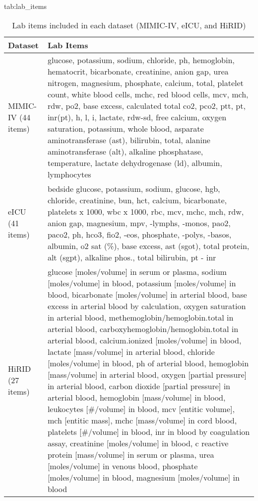 \begin{table*}[t]
\floatconts
    {tab:lab_items}
    {\caption{Lab items included in each dataset (MIMIC-IV, eICU, and HiRID)}}
    {
        \begin{tabular}{p{4cm}p{10cm}}
            \toprule
            \textbf{Dataset} & \textbf{Lab Items} \\
            \midrule
            MIMIC-IV (44 items) & glucose, potassium, sodium, chloride, ph, hemoglobin, hematocrit, bicarbonate, creatinine, anion gap, urea nitrogen, magnesium, phosphate, calcium, total, platelet count, white blood cells, mchc, red blood cells, mcv, mch, rdw, po2, base excess, calculated total co2, pco2, ptt, pt, inr(pt), h, l, i, lactate, rdw-sd, free calcium, oxygen saturation, potassium, whole blood, asparate aminotransferase (ast), bilirubin, total, alanine aminotransferase (alt), alkaline phosphatase, temperature, lactate dehydrogenase (ld), albumin, lymphocytes \\
            \midrule
            eICU (41 items)& bedside glucose, potassium, sodium, glucose, hgb, chloride, creatinine, bun, hct, calcium, bicarbonate, platelets x 1000, wbc x 1000, rbc, mcv, mchc, mch, rdw, anion gap, magnesium, mpv, -lymphs, -monos, pao2, paco2, ph, hco3, fio2, -eos, phosphate, -polys, -basos, albumin, o2 sat (\%), base excess, ast (sgot), total protein, alt (sgpt), alkaline phos., total bilirubin, pt - inr \\
            \midrule
            HiRID (27 items) & glucose [moles/volume] in serum or plasma, sodium [moles/volume] in blood, potassium [moles/volume] in blood, bicarbonate [moles/volume] in arterial blood, base excess in arterial blood by calculation, oxygen saturation in arterial blood, methemoglobin/hemoglobin.total in arterial blood, carboxyhemoglobin/hemoglobin.total in arterial blood, calcium.ionized [moles/volume] in blood, lactate [mass/volume] in arterial blood, chloride [moles/volume] in blood, ph of arterial blood, hemoglobin [mass/volume] in arterial blood, oxygen [partial pressure] in arterial blood, carbon dioxide [partial pressure] in arterial blood, hemoglobin [mass/volume] in blood, leukocytes [\#/volume] in blood, mcv [entitic volume], mch [entitic mass], mchc [mass/volume] in cord blood, platelets [\#/volume] in blood, inr in blood by coagulation assay, creatinine [moles/volume] in blood, c reactive protein [mass/volume] in serum or plasma, urea [moles/volume] in venous blood, phosphate [moles/volume] in blood, magnesium [moles/volume] in blood
            \\
            \bottomrule        
        \end{tabular}
    }
\end{table*}
